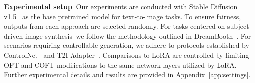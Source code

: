 \textbf{Experimental setup}. Our experiments are conducted with Stable Diffusion v1.5~\cite{rombach2022high} as the base pretrained model for text-to-image tasks. To ensure fairness, outputs from each approach are selected randomly. For tasks centered on subject-driven image synthesis, we follow the methodology outlined in DreamBooth~\cite{ruiz2023dreambooth}. For scenarios requiring controllable generation, we adhere to protocols established by ControlNet~\cite{zhang2023adding} and T2I-Adapter~\cite{mou2023t2i}. Comparisons to LoRA are controlled by limiting OFT and COFT modifications to the same network layers utilized by LoRA. Further experimental details and results are provided in Appendix~\ref{app:settings}.
